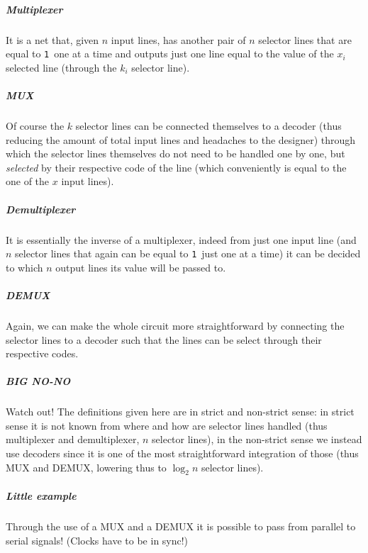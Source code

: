 \documentclass{scrartcl}
\newcommand{\one}{\texttt{1}}
\begin{document}
    \subparagraph{Multiplexer} It is a net that, given $n$ input lines, has another pair of $n$ selector lines that are equal to \one\ one at a time and outputs just one line equal to the value of the $x_i$ selected line (through the $k_i$ selector line).
    \subparagraph{MUX} Of course the $k$ selector lines can be connected themselves to a decoder (thus reducing the amount of total input lines and headaches to the designer) through which the selector lines themselves do not need to be handled one by one, but \emph{selected} by their respective code of the line (which conveniently is equal to the one of the $x$ input lines).
    \subparagraph{Demultiplexer} It is essentially the inverse of a multiplexer, indeed from just one input line (and $n$ selector lines that again can be equal to \one\ just one at a time) it can be decided to which $n$ output lines its value will be passed to.
    \subparagraph{DEMUX} Again, we can make the whole circuit more straightforward by connecting the selector lines to a decoder such that the lines can be select through their respective codes.
    \subparagraph{BIG NO-NO} Watch out! The definitions given here are in strict and non-strict sense: in strict sense it is not known from where and how are selector lines handled (thus multiplexer and demultiplexer, $n$ selector lines), in the non-strict sense we instead use decoders since it is one of the most straightforward integration of those (thus MUX and DEMUX, lowering thus to $\log_2{n}$ selector lines).
    \subparagraph{Little example} Through the use of a MUX and a DEMUX it is possible to pass from parallel to serial signals! (Clocks have to be in sync!)
\end{document}
